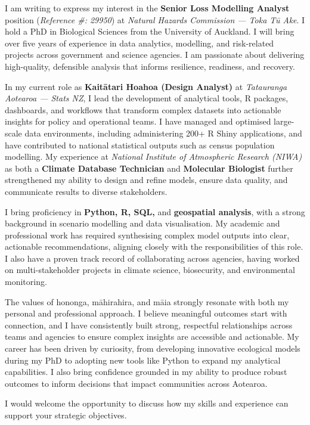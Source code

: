 I am writing to express my interest in the \textbf{Senior Loss Modelling Analyst} position (\textit{Reference #: 29950}) at 
\textit{Natural Hazards Commission — Toka Tū Ake}.
I hold a PhD in Biological Sciences from the University of Auckland. I will bring over five years of experience in data analytics,
modelling, and risk-related projects across government and science agencies. I am passionate about delivering high-quality,
defensible analysis that informs resilience, readiness, and recovery.

In my current role as \textbf{Kaitātari Hoahoa (Design Analyst)} at \textit{Tatauranga Aotearoa — Stats NZ}, I lead the development 
of analytical tools, R packages, dashboards, and workflows that transform complex datasets into actionable insights for policy and
operational teams. I have managed and optimised large-scale data environments, including administering 200+ R Shiny applications, 
and have contributed to national statistical outputs such as census population modelling. 
My experience at \textit{National Institute of Atmospheric Research (NIWA)} as both a \textbf{Climate Database Technician} and 
\textbf{Molecular Biologist} further  strengthened my ability to design and refine models, ensure data quality, 
and communicate results to diverse stakeholders.

I bring proficiency in \textbf{Python, R, SQL,} and \textbf{geospatial analysis}, with a strong background in scenario modelling and data visualisation.
My academic and professional work has required synthesising complex model outputs into clear, actionable recommendations, aligning 
closely with the responsibilities of this role. I also have a proven track record of collaborating across agencies, having worked 
on multi-stakeholder projects in climate science, biosecurity, and environmental monitoring.

The values of hononga, māhirahira, and māia strongly resonate with both my personal and professional approach.
I believe meaningful outcomes start with connection, and I have consistently built strong, respectful relationships across
teams and agencies to ensure complex insights are accessible and actionable. My career has been driven by curiosity, 
from developing innovative ecological models during my PhD to adopting new tools like Python to expand my analytical capabilities.
I also bring confidence grounded in my ability to produce robust outcomes to inform decisions that impact communities across Aotearoa.

I would welcome the opportunity to discuss how my skills and experience can support your strategic objectives.